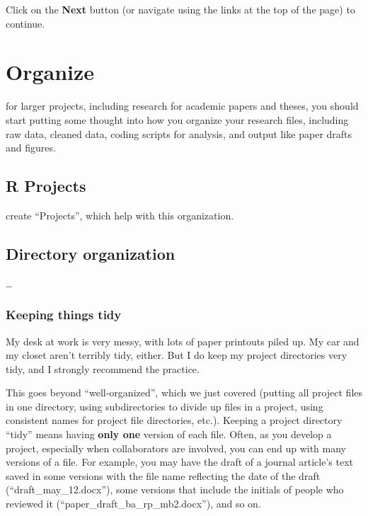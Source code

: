 \documentclass[]{tufte-book}
\begin{document}
Click on the \textbf{Next} button (or navigate using the
links at the top of the page) to continue.

\hypertarget{organize}{%
\chapter{Organize}\label{organize}}

 for larger projects, including research
for academic papers and theses, you should start putting some thought into how you
organize your research files, including raw data, cleaned data, coding scripts for
analysis, and output like paper drafts and figures.

\hypertarget{r-projects}{%
\section{R Projects}\label{r-projects}}

 create ``Projects'', which help with this organization.

\hypertarget{directory-organization}{%
\section{Directory organization}\label{directory-organization}}

\ldots{}

\hypertarget{keeping-things-tidy}{%
\subsection{Keeping things tidy}\label{keeping-things-tidy}}

My desk at work is very messy, with lots of paper printouts piled up. My car and my closet
aren't terribly tidy, either. But I do keep my project directories very tidy, and I
strongly recommend the practice.

This goes beyond ``well-organized'', which we just covered (putting all project
files in one directory, using subdirectories to divide up files in a project,
using consistent names for project file directories, etc.). Keeping a project directory
``tidy'' means having \textbf{only one} version of each file. Often, as you develop a project,
especially when collaborators are involved, you can end up with many versions of a
file. For example, you may have the draft of a journal article's text saved
in some versions with the file name reflecting the date of the draft (``draft\_may\_12.docx''),
some versions that include the initials of people who reviewed it (``paper\_draft\_ba\_rp\_mb2.docx''),
and so on.
\end{document}

